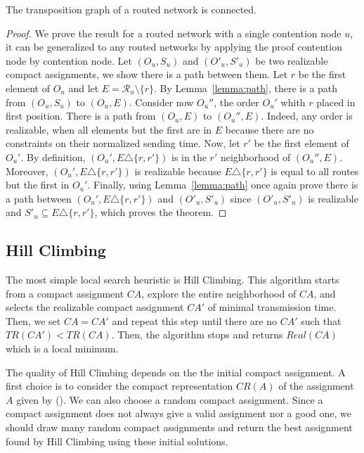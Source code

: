  \begin{theorem}
 The transposition graph of a routed network is connected.
 \end{theorem}
 \begin{proof}
 We prove the result for a routed network with a single contention node $u$, it can be generalized to any routed networks 
 by applying the proof contention node by contention node. Let $(O_u,S_u)$ and $(O'_u,S'_u)$ be two realizable compact assignments, we show there is a path between them. Let $r$ be the first element of 
$O_u$ and let $E = \mathcal{R}_u \setminus \{ r \}$. By Lemma~\ref{lemma:path}, there is a path from 
$(O_u,S_u)$ to $(O_u,E)$. Consider now $O_u''$, the order $O_u'$ whith $r$ placed in first position.
There is a path from $(O_u,E)$ to $(O_u'',E)$. Indeed, any order is realizable, when all elements but the first
are in $E$ because there are no constraints on their normalized sending time. 
Now, let $r'$ be the first element of $O_u'$. By definition, $(O_u',E \triangle \{r,r'\})$ is in the $r'$ neighborhood of $(O_u'',E)$. Moreover, $(O_u',E \triangle \{r,r'\})$ is realizable because $E \triangle \{r,r'\}$ is equal to all routes but the first in $O_u'$. 
Finally, using Lemma~\ref{lemma:path} once again prove there is a path between $(O_u',E \triangle \{r,r'\})$ and $(O'_u,S'_u)$ since $(O'_u,S'_u)$ is realizable and $S'_u \subseteq E \triangle \{r,r'\}$, which proves the theorem.
 \end{proof}




\subsection{Hill Climbing}\label{sec:hillclimb}

The most simple local search heuristic is Hill Climbing. This algorithm starts from a compact assignment $CA$, explore the entire neighborhood of $CA$, and selects the realizable compact assignment $CA'$ of minimal transmission time. Then, we set $CA = CA'$ and repeat this step until there are no $CA'$ such that $TR(CA') < TR(CA)$. Then, the algorithm stops and returns $Real(CA)$ which is a local minimum. 

The quality of Hill Climbing depends on the the initial compact assignment. A first choice is to consider the compact representation $CR(A)$ of the assignment $A$ given by \hybridgreedynormalized (\hgn). We can also choose a random compact assignment. Since a compact assignment does not always give a valid assignment nor a good one, we should draw many random compact assignments and return the best assignment found by Hill Climbing using these initial solutions.

